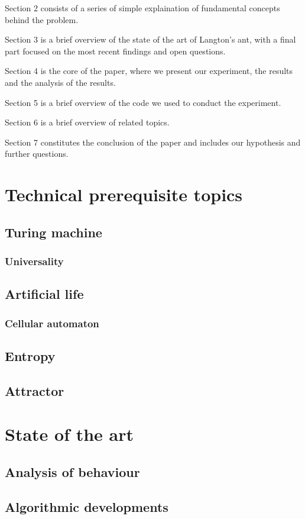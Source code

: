 \documentclass{article}
\begin{document}
Section 2 consists of a series of simple explaination of fundamental concepts behind the problem.

Section 3 is a brief overview of the state of the art of Langton's ant, with a final part focused on the most recent findings and open questions.

Section 4 is the core of the paper, where we present our experiment, the results and the analysis of the results.

Section 5 is a brief overview of the code we used to conduct the experiment.

Section 6 is a brief overview of related topics.

Section 7 constitutes the conclusion of the paper and includes our hypothesis and further questions.

\section{Technical prerequisite topics}
\subsection{Turing machine}
\subsubsection{Universality}
\subsection{Artificial life}
\subsubsection{Cellular automaton}
\subsection{Entropy}
\subsection{Attractor}

\section{State of the art}
\subsection{Analysis of behaviour}
\subsection{Algorithmic developments}
\end{document}
